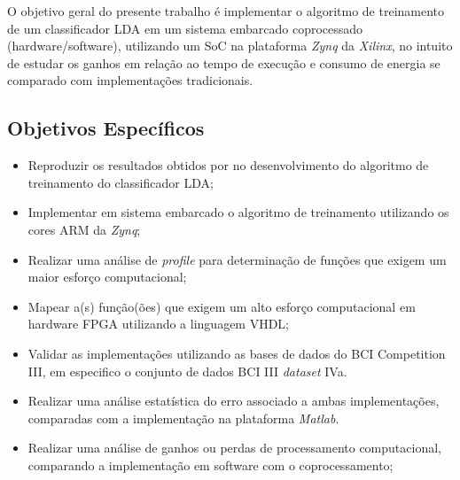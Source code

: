 	O objetivo geral do presente trabalho é implementar o algoritmo de treinamento de um classificador LDA em um sistema embarcado coprocessado (hardware/software), utilizando um SoC na plataforma \textit{Zynq} da \textit{Xilinx}, no intuito de estudar os ganhos em relação ao tempo de execução e consumo de energia se comparado com implementações tradicionais.

\subsection{Objetivos Específicos}

\begin{itemize}
	\item Reproduzir os resultados obtidos por \cite{F.Lotte} no desenvolvimento do algoritmo de treinamento do classificador LDA;

	\item Implementar em sistema embarcado o algoritmo de treinamento utilizando os cores ARM da \textit{Zynq};
	
	\item Realizar uma análise de \textit{profile} para determinação de funções que exigem um maior esforço computacional;
	
	\item Mapear a(s) função(ões) que exigem um alto esforço computacional em hardware FPGA utilizando a linguagem VHDL;
	

	\item Validar as implementações utilizando as bases de dados do BCI Competition III, em especifico o conjunto de dados BCI III \textit{dataset} IVa.
	
	\item Realizar uma análise estatística do erro associado a ambas implementações, comparadas com a implementação na plataforma \textit{Matlab}.
	
	\item Realizar uma análise de ganhos ou perdas de processamento computacional, comparando a implementação em software com o coprocessamento;
\end{itemize}
